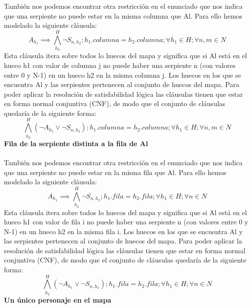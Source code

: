 \documentclass[11pt,spanish]{article}
\begin{document}
			También nos podemos encontrar otra restricción en el enunciado que nos indica que una serpiente no puede estar en la misma columna que Al. Para ello hemos modelado la siguiente cláusula:
			\begin{equation*}
				A_{h_1} \implies \bigwedge\limits_{h_2}^H \neg S_{n,h_2}; h_1.columna = h_2.columna; \forall h_1\in H; \forall n,m \in N
			\end{equation*}
			Esta cláusula itera sobre todos lo huecos del mapa y significa que si Al está en el hueco h1 con valor de columna j  no puede haber una serpiente n (con valores entre 0 y N-1) en un hueco h2  en la misma columna j. Los huecos en los que se encuentra Al y las serpientes pertenecen al conjunto de huecos del mapa. Para poder aplicar la resolución de satisfabilidad lógica las cláusulas tienen que estar en forma normal conjuntiva (CNF), de modo que el conjunto de cláusulas quedaría de la siguiente forma:
			\begin{equation*}
				\bigwedge\limits_{h_2}^H (\neg A_{h_1} \lor \neg S_{n,h_2}); h_1.columna = h_2.columna; \forall h_1\in H; \forall n,m \in N
			\end{equation*}
			\textbf{Fila de la serpiente distinta a la fila de Al}\\\\
			También nos podemos encontrar otra restricción en el enunciado que nos indica que una serpiente no puede estar en la misma fila que Al. Para ello hemos modelado la siguiente cláusula:
			\begin{equation*}
				A_{h_1} \implies \bigwedge\limits_{h_2}^H \neg S_{n,h_2}; h_1.fila = h_2.fila; \forall h_1\in H; \forall n\in N
			\end{equation*}
			Esta cláusula itera sobre todos lo huecos del mapa y significa que si Al está en el hueco h1 con valor de fila i  no puede haber una serpiente n (con valores entre 0 y N-1) en un hueco h2  en la misma fila i. Los huecos en los que se encuentra Al y las serpientes pertenecen al conjunto de huecos del mapa. Para poder aplicar la resolución de satisfabilidad lógica las cláusulas tienen que estar en forma normal conjuntiva (CNF), de modo que el conjunto de cláusulas quedaría de la siguiente forma:
			\begin{equation*}
				\bigwedge\limits_{h_2}^H (\neg A_{h_1} \lor \neg S_{n,h_2}); h_1.fila = h_2.fila; \forall h_1\in H; \forall n\in N
			\end{equation*}
			\textbf{Un único personaje en el mapa}\\\\
\end{document}
